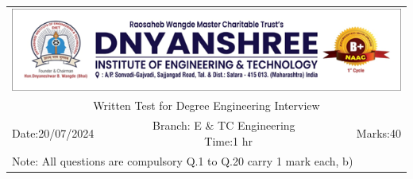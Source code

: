 \documentclass[a4, 12pt, addpoints]{exam}
\begin{document}
\def\arraystretch{1}
\begin{longtable}{lp{}p{}r}
\multicolumn{4}{c}{\includegraphics[width= \textwidth]{dietlogo}} \\ 
\multicolumn{4}{c}{Written Test for Degree Engineering Interview} \\
Date:20/07/2024 & \multicolumn{2}{c}{ ~~~Branch: E \& TC Engineering ~~~~ Time:1 hr} & Marks:40 \\
\multicolumn{4}{l}{ Note: All questions are compulsory Q.1 to Q.20 carry 1 mark each, b)  } \\ \hline
\end{longtable}
\end{document}
